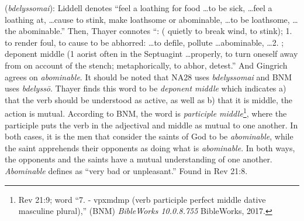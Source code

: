 \item[Abominable,]

(\textit{bdelyssomai}):
Liddell denotes ``feel a loathing for food \ldots to be sick, \ldots feel a loathing at, \ldots cause to stink, make loathsome or abominable, \ldots to be loathsome, \ldots the abominable.'' Then, Thayer connotes ``: ( quietly to break wind, to stink);  1. to render foul, to cause to be abhorred: \ldots to defile, pollute \ldots abominable, \ldots 2. ; deponent middle (1 aorist  often in the Septuagint \ldots properly, to turn oneself away from on account of the stench; metaphorically, to abhor, detest.'' And Gingrich agrees on \textit{abominable}. It should be noted that NA28 uses \emph{bdelyssomai} and BNM uses  \emph{bdelyssō}. Thayer finds this word to be \emph{deponent middle} which indicates a) that the verb should be understood as active, as well as b) that it is middle, the action is mutual. According to BNM, the word is \emph{participle middle}\footnote{Rev 21:9; word ``7.   - vpxmdmp (verb participle perfect middle dative masculine plural),'' (BNM) \emph{BibleWorks 10.0.8.755} BibleWorks, 2017.}, where the participle puts the verb in the adjectival and middle as mutual to one another. In both cases, it is the men that consider the saints of God to be \emph{abominable}, while the saint apprehends their opponents as doing what is \emph{abominable}. In both ways, the opponents and the saints have a mutual understanding of one another. \textit{Abominable} defines as ``very bad or unpleasant.''
Found in Rev 21:8.

